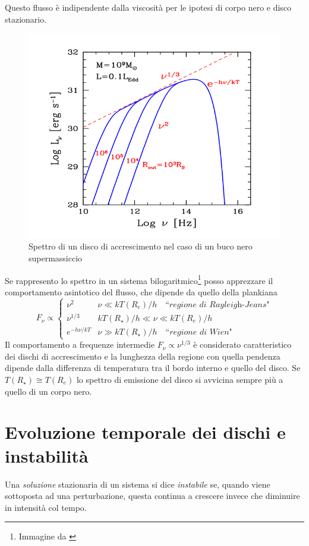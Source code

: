 \documentclass[a4paperbi]{article}
\begin{document}
	Questo flusso è indipendente dalla viscosità per le ipotesi di corpo nero e disco stazionario.
	
	\begin{figure}[H]
		\centering
		\includegraphics[width=0.7\linewidth]{SpettroDiscoGhisellini}
		\caption{Spettro di un disco di accrescimento nel caso di un buco nero supermassiccio}
		\label{fig:SpettroDiscoGhisellini}
	\end{figure}	

	Se rappresento lo spettro in un sistema bilogaritmico\footnote{Immagine da \cite{GhiselliniRadiativi}} posso apprezzare il comportamento asintotico del flusso, che dipende da quello della plankiana
	\begin{equation}
		F_\nu\propto\begin{cases}
						\nu^2 & \nu\ll kT(R_{e})/h \quad\textit{``regione di Rayleigh-Jeans"}\\
						\nu^{1/3} & kT(R_{\star})/h\ll\nu\ll kT(R_{e})/h\\
						e^{-h\nu/kT} & \nu\gg kT(R_{\star})/h\quad\textit{``regione di Wien"}						
					\end{cases}
	\end{equation}
	Il comportamento a frequenze intermedie $F_\nu\propto\nu^{1/3}$ è considerato caratteristico dei dischi di accrescimento e la lunghezza della regione con quella pendenza dipende dalla differenza di temperatura tra il bordo interno e quello del disco. Se $T(R_{\star})\cong T(R_{e})$ lo spettro di emissione del disco si avvicina sempre più a quello di un corpo nero.
		
\newpage
\section{Evoluzione temporale dei dischi e instabilità}
	Una \textit{soluzione} stazionaria di un sistema si dice \textit{instabile} se, quando viene sottoposta ad una perturbazione, questa continua a crescere invece che diminuire in intensità col tempo.
\end{document}
